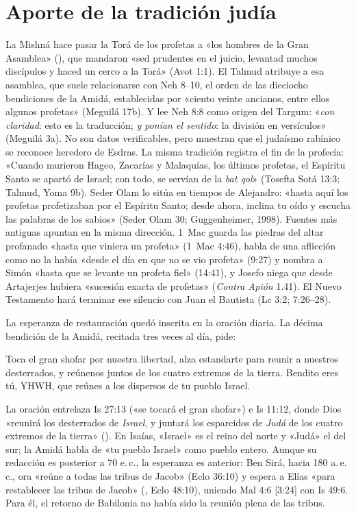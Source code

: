\section{Aporte de la tradición judía}

La Mishná hace pasar la Torá de los profetas a «los hombres de la Gran Asamblea» (), que mandaron «sed prudentes en el juicio, levantad muchos discípulos y haced un cerco a la Torá» (Avot 1:1). El Talmud atribuye a esa asamblea, que suele relacionarse con Neh 8--10, el orden de las dieciocho bendiciones de la Amidá, establecidas por «ciento veinte ancianos, entre ellos algunos profetas» (Meguilá 17b). Y lee Neh 8:8 como origen del Targum: «\emph{con claridad}: esto es la traducción; \emph{y ponían el sentido}: la división en versículos» (Meguilá 3a). No son datos verificables, pero muestran que el judaísmo rabínico se reconoce heredero de Esdras. La misma tradición registra el fin de la profecía: «Cuando murieron Hageo, Zacarías y Malaquías, los últimos profetas, el Espíritu Santo se apartó de Israel; con todo, se servían de la \emph{bat qol}» (Tosefta Sotá 13:3; Talmud, Yoma 9b). Seder Olam lo sitúa en tiempos de Alejandro: «hasta aquí los profetas profetizaban por el Espíritu Santo; desde ahora, inclina tu oído y escucha las palabras de los sabios» (Seder Olam 30; Guggenheimer, 1998). Fuentes más antiguas apuntan en la misma dirección. 1~Mac guarda las piedras del altar profanado «hasta que viniera un profeta» (1~Mac 4:46), habla de una aflicción como no la había «desde el día en que no se vio profeta» (9:27) y nombra a Simón «hasta que se levante un profeta fiel» (14:41), y Josefo niega que desde Artajerjes hubiera «sucesión exacta de profetas» (\emph{Contra Apión} 1.41). El Nuevo Testamento hará terminar ese silencio con Juan el Bautista (Lc 3:2; 7:26--28).

La esperanza de restauración quedó inscrita en la oración diaria. La décima bendición de la Amidá, recitada tres veces al día, pide:
\begin{cita}Toca el gran shofar por nuestra libertad, alza estandarte para reunir a nuestros desterrados, y reúnenos juntos de los cuatro extremos de la tierra. Bendito eres tú, YHWH, que reúnes a los dispersos de tu pueblo Israel.\end{cita}
La oración entrelaza Is 27:13 («se tocará el gran shofar») e Is 11:12, donde Dios «reunirá los desterrados de \emph{Israel}, y juntará los esparcidos de \emph{Judá} de los cuatro extremos de la tierra» (). En Isaías, «Israel» es el reino del norte y «Judá» el del sur; la Amidá habla de «tu pueblo Israel» como pueblo entero. Aunque su redacción es posterior a 70 e.\,c., la esperanza es anterior: Ben Sirá, hacia 180 a.\,e.\,c., ora «reúne a todas las tribus de Jacob» (Eclo 36:10) y espera a Elías «para restablecer las tribus de Jacob» (, Eclo 48:10), uniendo Mal 4:6 [3:24] con Is 49:6. Para él, el retorno de Babilonia no había sido la reunión plena de las tribus.

